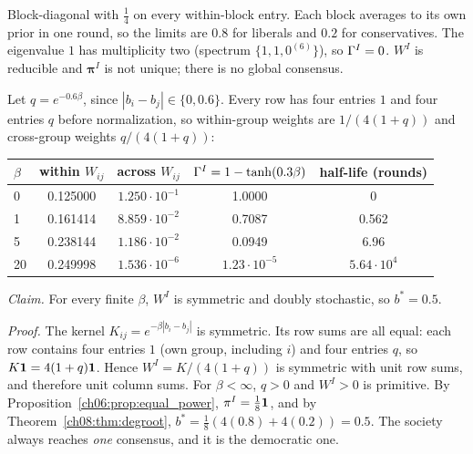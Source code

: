 \documentclass[../solutions_manual.tex]{subfiles}
\begin{document}
 Block-diagonal with $\frac14$ on every within-block entry. Each block averages to its own prior in one round, so the limits are $0.8$ for liberals and $0.2$ for conservatives. The eigenvalue $1$ has multiplicity two (spectrum $\{1, 1, 0^{(6)}\}$), so $\Gamma^I = 0$. $W^I$ is reducible and $\boldsymbol{\pi}^I$ is not unique; there is no global consensus.

 Let $q = e^{-0.6\beta}$, since $|b_i - b_j| \in \{0, 0.6\}$. Every row has four entries $1$ and four entries $q$ before normalization, so within-group weights are $1/(4(1+q))$ and cross-group weights $q/(4(1+q))$:
\begin{center}
\begin{tabular}{lcccc}
\toprule
$\beta$ & within $W_{ij}$ & across $W_{ij}$ & $\Gamma^I = 1 - \tanh(0.3\beta)$ & half-life (rounds) \\
\midrule
0 & 0.125000 & $1.250\cdot10^{-1}$ & 1.0000 & 0 \\
1 & 0.161414 & $8.859\cdot10^{-2}$ & 0.7087 & 0.562 \\
5 & 0.238144 & $1.186\cdot10^{-2}$ & 0.0949 & 6.96 \\
20 & 0.249998 & $1.536\cdot10^{-6}$ & $1.23\cdot10^{-5}$ & $5.64\cdot10^{4}$ \\
\bottomrule
\end{tabular}
\end{center}
\begin{center}
\end{center}

 \emph{Claim.} For every finite $\beta$, $W^I$ is symmetric and doubly stochastic, so $b^* = 0.5$.

\emph{Proof.} The kernel $K_{ij} = e^{-\beta|b_i - b_j|}$ is symmetric. Its row sums are all equal: each row contains four entries $1$ (own group, including $i$) and four entries $q$, so $K\mathbf{1} = 4(1+q)\mathbf{1}$. Hence $W^I = K/(4(1+q))$ is symmetric with unit row sums, and therefore unit column sums. For $\beta < \infty$, $q > 0$ and $W^I > 0$ is primitive. By Proposition~\ref{ch06:prop:equal_power}, $\pi^I = \frac18\mathbf{1}$, and by Theorem~\ref{ch08:thm:degroot}, $b^* = \frac18(4(0.8) + 4(0.2)) = 0.5$. The society always reaches \emph{one} consensus, and it is the democratic one.
\end{document}

